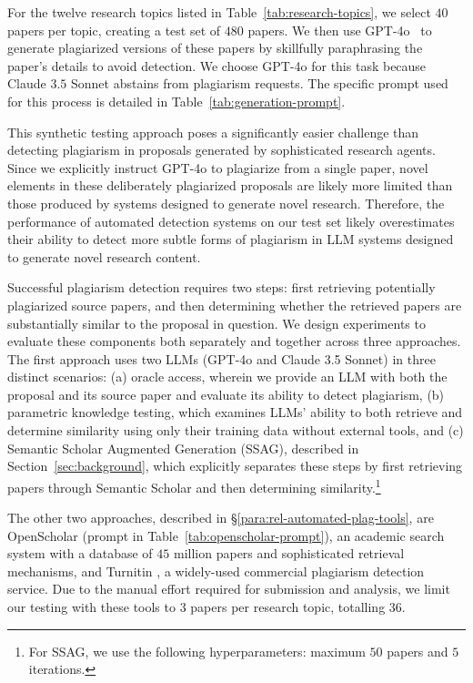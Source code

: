 For the twelve research topics listed in Table~\ref{tab:research-topics}, 
we select $40$ papers per topic, 
creating a test set of $480$ papers.
We then use GPT-4o~\citep{openai2024gpt4ocard} 
to generate plagiarized versions of these papers 
by skillfully paraphrasing the paper's details
to avoid detection.
We choose GPT-4o for this task because Claude $3.5$ Sonnet abstains from plagiarism requests. 
The specific prompt used for this process is detailed in Table~\ref{tab:generation-prompt}.

This synthetic testing 
approach poses a significantly easier challenge 
than detecting plagiarism in proposals 
generated by sophisticated research agents. 
Since we explicitly instruct GPT-4o 
to plagiarize from a single paper,
novel elements in these deliberately plagiarized proposals 
are likely more limited 
than those produced by systems designed to generate novel research. 
Therefore, the performance of automated detection systems on our test set 
likely overestimates their ability to detect more subtle forms of plagiarism 
in LLM systems designed to generate novel research content.

Successful plagiarism detection 
requires two steps: 
first retrieving potentially plagiarized source papers, 
and then determining whether the retrieved papers 
are substantially similar to the proposal in question. 
We design experiments to evaluate these 
components both separately and together across three approaches. 
The first approach uses two LLMs (GPT-4o and Claude 3.5 Sonnet) 
in three distinct scenarios: 
(a) oracle access, wherein we provide an LLM with 
both the proposal and its source paper
and evaluate its ability to detect plagiarism,
(b) parametric knowledge testing, 
which examines LLMs' ability to both retrieve and determine 
similarity using only their training data without external tools, 
and (c) Semantic Scholar Augmented Generation (SSAG), described in Section~\ref{sec:background}, 
which explicitly 
separates these steps by first retrieving papers through Semantic Scholar 
and then determining similarity.\footnote{For SSAG, we use the following hyperparameters: maximum $50$ papers and $5$ iterations.}


The other two approaches, described in \S\ref{para:rel-automated-plag-tools}, are OpenScholar \citep{asai2024openscholar} (prompt in Table~\ref{tab:openscholar-prompt}), an academic search system with a database of $45$ million papers and sophisticated retrieval mechanisms, and Turnitin \cite{turnitin}, a widely-used commercial plagiarism detection service. Due to the manual effort required for submission and analysis, we limit our testing with these tools to $3$ papers per research topic, totalling $36$.
